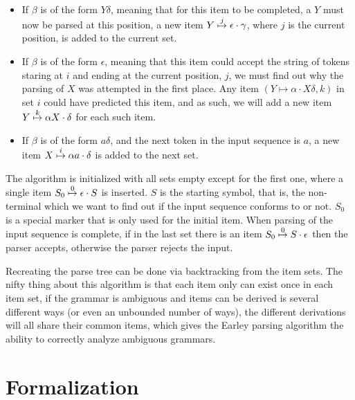 		\begin{itemize}
			\item

				If $\beta$ is of the form $Y\delta$, meaning that for this item
				to be completed, a $Y$ must now be parsed at this position, a
				new item $\earley{Y}{\epsilon}{\gamma}{j}$, where $j$ is the
				current position, is added to the current set.

			\item

				If $\beta$ is of the form $\epsilon$, meaning that this item
				could accept the string of tokens staring at $i$ and ending at
				the current position, $j$, we must find out why the parsing of
				$X$ was attempted in the first place. Any item $(Y \mapsto
				\alpha \cdot X\delta, k)$ in set $i$  could have predicted this
				item, and as such, we will add a new item $\earley{Y}{\alpha
				X}{\delta}{k}$ for each such item.

			\item

				If $\beta$ is of the form $a\delta$, and the next token in the
				input sequence is $a$, a new item
				$\earley{X}{\alpha a}{\delta}{i}$ is added to the next
				set.

		\end{itemize}

		The algorithm is initialized with all sets empty except for the first
		one, where a single item $\earley{S_0}{\epsilon}{S}{0}$ is
		inserted.  $S$ is the starting symbol, that is, the non-terminal which
		we want to find out if the input sequence conforms to or not. $S_0$ is
		a special marker that is only used for the initial item. When parsing
		of the input sequence is complete, if in the last set there is an item
		$\earley{S_0}{S}{\epsilon}{0}$ then the parser accepts, otherwise
		the parser rejects the input.

		Recreating the parse tree can be done via backtracking from the item
		sets. The nifty thing about this algorithm is that each item only can
		exist once in each item set, if the grammar is ambiguous and items can
		be derived is several different ways (or even an unbounded number of
		ways), the different derivations will all share their common items,
		which gives the Earley parsing algorithm the ability to correctly
		analyze ambiguous grammars.

	\section{Formalization}

